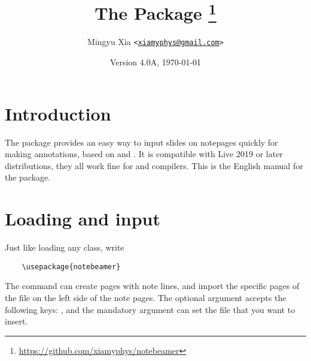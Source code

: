 \documentclass[svgnames,letterpaper]{l3doc}
\title
{
  \bfseries
  The \cls{notebeamer} Package
  \thanks{\url{https://github.com/xiamyphys/notebeamer}}
}
\author
{
  Mingyu Xia \texttt{<\href{mailto:xiamyphys@gmail.com}{xiamyphys@gmail.com}>}
}
\date{Version 4.0A, \today}
\begin{document}
\maketitle

\section{Introduction}

The  package provides an easy way to input slides on notepages quickly for making annotations, based on  and . It is compatible with  Live 2019 or later distributions, they all work fine for  and  compilers. This is the English manual for the  package.

\section{Loading  and input}

Just like loading any class, write

\begin{framed}
  \begin{verbatim}
    \usepackage{notebeamer}
  \end{verbatim}
\end{framed}

\begin{function}{}
  \begin{syntax}
       
  \end{syntax}
\end{function}

The  command can create pages with note lines, and import the specific pages of the  file on the left side of the note pages. The optional argument accepts the following keys:       , and the mandatory argument can set the  file that you want to insert.
\end{document}
